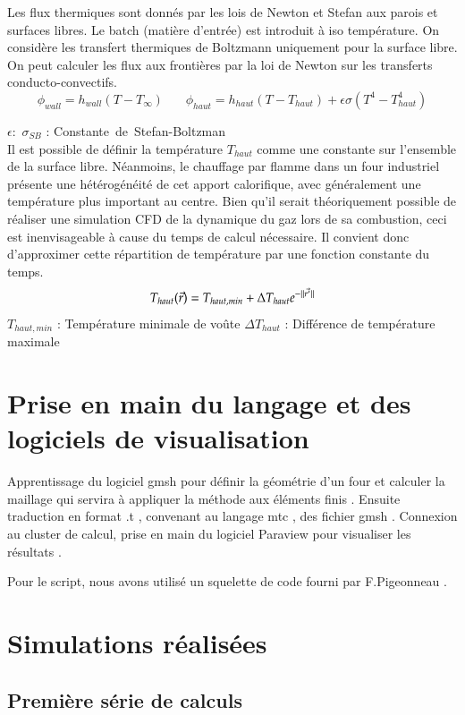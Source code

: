\documentclass[12pt, a4paper, french, BCOR = 0pt, DIV = 10]{scrartcl}
\begin{document}
	Les flux thermiques sont donnés par les lois de Newton et Stefan aux parois et surfaces libres. Le batch (matière d'entrée) est introduit à iso température. On considère les transfert thermiques de Boltzmann uniquement pour la surface libre.
	On peut calculer les flux aux frontières par la loi de Newton sur les transferts conducto-convectifs.\\ 
	\centering
	$$
	\phi_{wall} = h_{wall} (T - T_{\infty}) ~~~~~~~~	
	\phi_{haut} = h_{haut} (T - T_{haut}) + \epsilon \sigma (T^4 - T_{haut}^4)
	$$
    \raggedright
    $\epsilon : $\break
    $\sigma_{SB}$ : Constante\ de\ Stefan-Boltzman
    \\[0.5 cm]
    Il est possible de définir la température $T_{haut}$ comme une constante sur l'ensemble de la surface libre. Néanmoins, le chauffage par flamme dans un four industriel présente une hétérogénéité de cet apport calorifique, avec généralement une température plus important au centre. Bien qu'il serait théoriquement possible de réaliser une simulation CFD de la dynamique du gaz lors de sa combustion, ceci est inenvisageable à cause du temps de calcul nécessaire. Il convient donc d'approximer cette répartition de température par une fonction constante du temps.
    $$
        T_{haut}(\vec{r}) = T_{haut, min} + \Delta T_{haut} \space e^{-||\vec{r^{\prime}}||}
    $$
    $T_{haut, min}$ : Température minimale de voûte
    \break
    $\Delta T_{haut}$ : Différence de température maximale
	
	\section{Prise en main du langage et des logiciels de visualisation}
 	\raggedright
	Apprentissage du logiciel gmsh pour définir la géométrie d'un four et calculer la maillage qui servira à appliquer la méthode aux éléments finis . Ensuite traduction en format .t , convenant au langage mtc , des fichier gmsh . 
	Connexion au cluster de calcul, prise en main du logiciel Paraview pour visualiser les résultats .
	
	Pour le script, nous avons utilisé un squelette de code fourni par F.Pigeonneau .
	
	\section{Simulations réalisées}
	
	\subsection{Première série de calculs}
\end{document}
